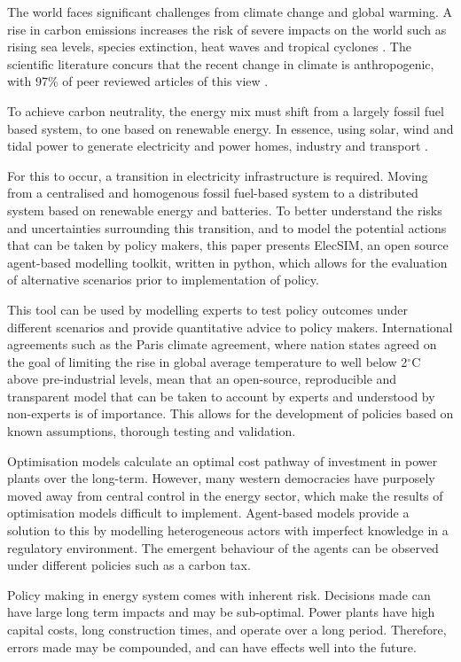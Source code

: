 
The world faces significant challenges from climate change and global warming. A rise in carbon emissions increases the risk of severe impacts on the world such as rising sea levels, species extinction, heat waves and tropical cyclones \cite{IPCC2014}. The scientific literature concurs that the recent change in climate is anthropogenic, with 97\% of peer reviewed articles of this view \cite{Cook2013}.  

To achieve carbon neutrality, the energy mix must shift from a largely fossil fuel based system, to one based on renewable energy. In essence, using solar, wind and tidal power to generate electricity and power homes, industry and transport \cite{Hoffert2002}. 

For this to occur, a transition in electricity infrastructure is required. Moving from a centralised and homogenous fossil fuel-based system to a distributed system based on renewable energy and batteries. To better understand the risks and uncertainties surrounding this transition, and to model the potential actions that can be taken by policy makers, this paper presents ElecSIM, an open source agent-based modelling toolkit, written in python, which allows for the evaluation of alternative scenarios prior to implementation of policy. 

This tool can be used by modelling experts to test policy outcomes under different scenarios and provide quantitative advice to policy makers. International agreements such as the Paris climate agreement, where nation states agreed on the goal of limiting the rise in global average temperature to well below 2$^\circ$C above pre-industrial levels, mean that an open-source, reproducible and transparent model that can be taken to account by experts and understood by non-experts is of importance. This allows for the development of policies based on known assumptions, thorough testing and validation.

Optimisation models calculate an optimal cost pathway of investment in power plants over the long-term. However, many western democracies have purposely moved away from central control in the energy sector, which make the results of optimisation models difficult to implement. Agent-based models provide a solution to this by modelling heterogeneous actors with imperfect knowledge in a regulatory environment. The emergent behaviour of the agents can be observed under different policies such as a carbon tax.

Policy making in energy system comes with inherent risk. Decisions made can have large long term impacts and may be sub-optimal. Power plants have high capital costs, long construction times, and operate over a long period. Therefore, errors made may be compounded, and can have effects well into the future.


